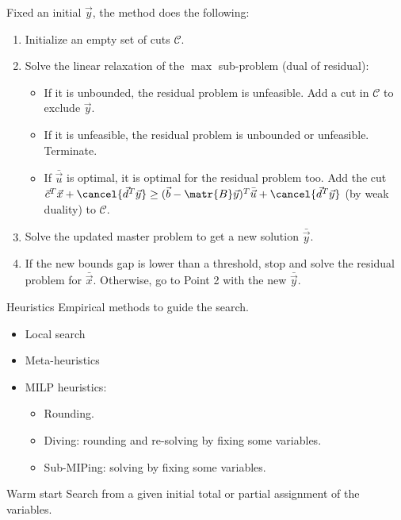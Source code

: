 \begin{descriptionlist}
\begin{description}
                Fixed an initial $\vec{y}$, the method does the following:
                \begin{enumerate}
                    \item Initialize an empty set of cuts $\mathcal{C}$.
                    \item Solve the linear relaxation of the $\max$ sub-problem (dual of residual):
                        \begin{itemize}
                            \item If it is unbounded, the residual problem is unfeasible. Add a cut in $\mathcal{C}$ to exclude $\vec{y}$.
                            \item If it is unfeasible, the residual problem is unbounded or unfeasible. Terminate.
                            \item If $\bar{\vec{u}}$ is optimal, it is optimal for the residual problem too.
                                Add the cut $\vec{c}^T\vec{x} + \cancel{\vec{d}^T\vec{y}} \geq (\vec{b} - \matr{B}\vec{y})^T \bar{\vec{u}} + \cancel{\vec{d}^T\vec{y}}$ 
                                (by weak duality) to $\mathcal{C}$.
                        \end{itemize}
                    \item Solve the updated master problem to get a new solution $\bar{\vec{y}}$.
                    \item If the new bounds gap is lower than a threshold, stop and solve the residual problem for $\bar{\vec{x}}$.
                        Otherwise, go to Point 2 with the new $\bar{\vec{y}}$.
                \end{enumerate}
        \end{description}

    \item[Heuristics] 
        Empirical methods to guide the search.
        \begin{itemize}
            \item Local search
            \item Meta-heuristics
            \item MILP heuristics:
            \begin{itemize}
                \item Rounding.
                \item Diving: rounding and re-solving by fixing some variables.
                \item Sub-MIPing: solving by fixing some variables.
            \end{itemize}
        \end{itemize}

    \item[Warm start] 
        Search from a given initial total or partial assignment of the variables.
\end{descriptionlist}



